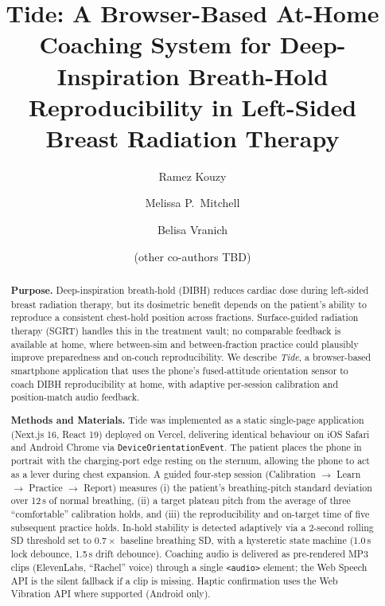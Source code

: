 \documentclass[3p,times]{elsarticle}
\begin{document}
\begin{frontmatter}

\title{Tide: A Browser-Based At-Home Coaching System for Deep-Inspiration
Breath-Hold Reproducibility in Left-Sided Breast Radiation Therapy}

\author[mdacc]{Ramez Kouzy}

\author[mdacc]{Melissa P.~Mitchell}
\author[breath]{Belisa Vranich}
\author[mdacc]{(other co-authors TBD)}

\address[mdacc]{Department of Radiation Oncology, The University of Texas
MD Anderson Cancer Center, Houston, Texas, USA}
\address[breath]{The Breathing Class, New York, NY, USA}


\begin{abstract}
\textbf{Purpose.} Deep-inspiration breath-hold (DIBH) reduces cardiac
dose during left-sided breast radiation therapy, but its dosimetric
benefit depends on the patient's ability to reproduce a consistent
chest-hold position across fractions. Surface-guided radiation therapy
(SGRT) handles this in the treatment vault; no comparable feedback is
available at home, where between-sim and between-fraction practice
could plausibly improve preparedness and on-couch reproducibility. We
describe \emph{Tide}, a browser-based smartphone application that uses
the phone's fused-attitude orientation sensor to coach DIBH
reproducibility at home, with adaptive per-session calibration and
position-match audio feedback.

\textbf{Methods and Materials.} Tide was implemented as a static
single-page application (Next.js 16, React 19) deployed on Vercel,
delivering identical behaviour on iOS Safari and Android Chrome via
\texttt{DeviceOrientationEvent}. The patient places the phone in
portrait with the charging-port edge resting on the sternum, allowing
the phone to act as a lever during chest expansion. A guided
four-step session (Calibration $\rightarrow$ Learn $\rightarrow$
Practice $\rightarrow$ Report) measures (i) the patient's
breathing-pitch standard deviation over 12\,s of normal breathing,
(ii) a target plateau pitch from the average of three ``comfortable''
calibration holds, and (iii) the reproducibility and on-target time
of five subsequent practice holds. In-hold stability is detected
adaptively via a 2-second rolling SD threshold set to
$0.7\times$ baseline breathing SD, with a hysteretic state machine
(1.0\,s lock debounce, 1.5\,s drift debounce). Coaching audio is
delivered as pre-rendered MP3 clips (ElevenLabs, ``Rachel'' voice)
through a single \texttt{<audio>} element; the Web Speech API is the
silent fallback if a clip is missing. Haptic confirmation uses the
Web Vibration API where supported (Android only).


\end{abstract}
\end{frontmatter}
\end{document}
